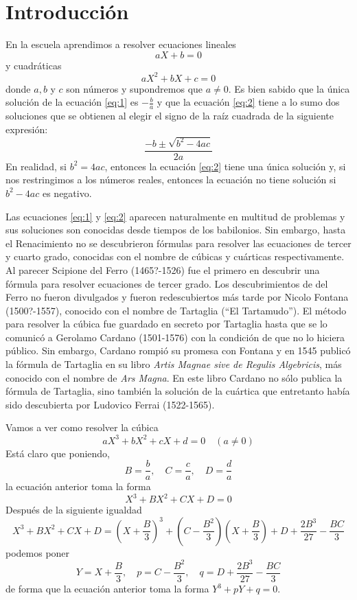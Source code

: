 \chapter{Introducción}

En la escuela aprendimos a resolver ecuaciones lineales
\begin{equation}\label{eq:1}
    aX + b = 0
\end{equation}
y cuadráticas
\begin{equation}\label{eq:2}
    aX^2 + bX + c = 0
\end{equation}
donde $a,b$ y $c$ son números y supondremos que $a\neq 0$. Es bien sabido que la única solución de la ecuación \ref{eq:1} es $-\frac{b}{a}$ y que la ecuación \ref{eq:2} tiene a lo sumo dos soluciones que se obtienen al elegir el signo de la raíz cuadrada de la siguiente expresión:
\begin{equation}\label{eq:3}
    \frac{-b\pm \sqrt{b^2-4ac}}{2a}    
\end{equation}
En realidad, si $b^2=4ac$, entonces la ecuación \ref{eq:2} tiene una única solución y, si nos restringimos a los números reales, entonces la ecuación no tiene solución si $b^2-4ac$ es negativo.

Las ecuaciones \ref{eq:1} y \ref{eq:2} aparecen naturalmente en multitud de problemas y sus soluciones son conocidas desde tiempos de los babilonios. Sin embargo, hasta el Renacimiento no se descubrieron fórmulas para resolver las ecuaciones de tercer y cuarto grado, conocidas con el nombre de cúbicas y cuárticas respectivamente. Al parecer Scipione del Ferro (1465?-1526) fue el primero en descubrir una fórmula para resolver ecuaciones de tercer grado. Los descubrimientos de del Ferro no fueron divulgados y fueron redescubiertos más tarde por Nicolo Fontana (1500?-1557), conocido con el nombre de Tartaglia (``El Tartamudo''). El método para resolver la cúbica fue guardado en secreto por Tartaglia hasta que se lo comunicó a Gerolamo Cardano (1501-1576) con la condición de que no lo hiciera público. Sin embargo, Cardano rompió su promesa con Fontana y en 1545 publicó la fórmula de Tartaglia en su libro {\it Artis Magnae sive de Regulis Algebricis}, más conocido con el nombre de {\it Ars Magna}. En este libro Cardano no sólo publica la fórmula de Tartaglia, sino también la solución de la cuártica que entretanto había sido descubierta por Ludovico Ferrai (1522-1565).

Vamos a ver como resolver la cúbica
\begin{equation}
    aX^3+bX^2+cX+d=0\quad (a\neq 0)
\end{equation}
Está claro que poniendo,
$$B=\frac{b}{a}, \quad C=\frac{c}{a}, \quad D=\frac{d}{a}$$
la ecuación anterior toma la forma
\begin{equation}
    X^3+BX^2+CX+D=0
\end{equation}
Después de la siguiente igualdad
$$X^3+BX^2+CX+D=\left(X+\frac{B}{3}\right)^3+\left(C-\frac{B^2}{3}\right)\left(X+\frac{B}{3}\right)+D+\frac{2B^3}{27}-\frac{BC}{3}$$
podemos poner
$$Y=X+\frac{B}{3}, \quad p=C-\frac{B^2}{3}, \quad q=D+\frac{2B^3}{27}-\frac{BC}{3}$$
de forma que la ecuación anterior toma la forma $Y^3+pY+q=0$.

